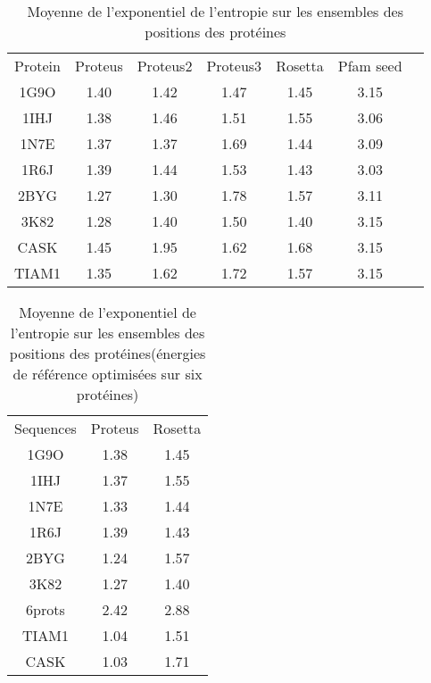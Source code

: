     \clearpage

    \begin{table}[!htbp]
      \centering

      \begin{tabular}{ccccccc}

        \toprule
        Protein & Proteus &  Proteus2 &  Proteus3 & Rosetta & Pfam seed \\
        \cmidrule{1-6}
        1G9O  & 1.40 & 1.42 & 1.47 & 1.45 & 3.15  \\
        1IHJ  & 1.38 & 1.46 & 1.51 & 1.55 & 3.06  \\
        1N7E  & 1.37 & 1.37 & 1.69 & 1.44 & 3.09  \\
        1R6J  & 1.39 & 1.44 & 1.53 & 1.43 & 3.03  \\
        2BYG  & 1.27 & 1.30 & 1.78 & 1.57 & 3.11  \\
        3K82  & 1.28 & 1.40 & 1.50 & 1.40 & 3.15  \\
        CASK  & 1.45 & 1.95 & 1.62 & 1.68 & 3.15  \\
        TIAM1 & 1.35 & 1.62 & 1.72 & 1.57 & 3.15  \\
        \bottomrule

      \end{tabular}      
      \caption{Moyenne de l'exponentiel de l'entropie sur les ensembles des positions des protéines}
\label{tab:Entropie_PDZ}      
    \end{table}


    \clearpage


    \clearpage

    \begin{table}[!htbp]
      \centering

      \begin{tabular}{ccc}

        \toprule
        Sequences & Proteus & Rosetta \\
        \cmidrule{1-3}
        1G9O  & 1.38  & 1.45 \\
        1IHJ  & 1.37  & 1.55 \\
        1N7E  & 1.33  & 1.44 \\
        1R6J  & 1.39  & 1.43 \\
        2BYG  & 1.24  & 1.57 \\
        3K82  & 1.27  & 1.40 \\
        6prots & 2.42  & 2.88 \\
        TIAM1  & 1.04  & 1.51 \\
        CASK   & 1.03  & 1.71 \\

        \bottomrule

      \end{tabular}      
      \caption{Moyenne de l'exponentiel de l'entropie sur les ensembles des positions des protéines(énergies de référence optimisées sur six protéines)}
\label{tab:Entropie_PDZ}      
    \end{table}


